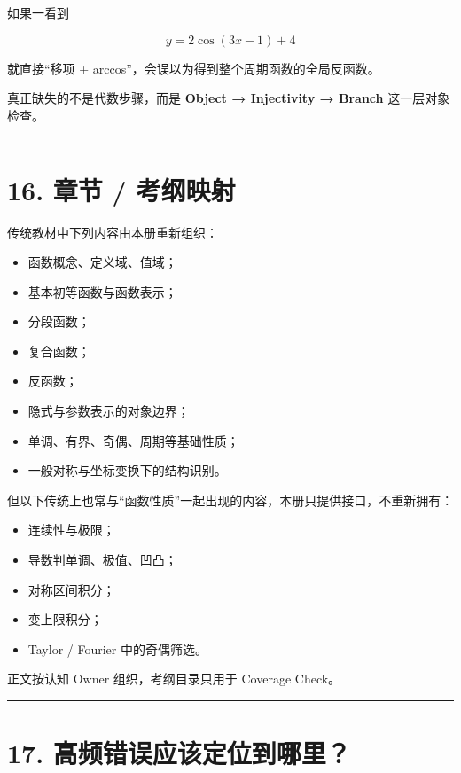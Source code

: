 \documentclass[11pt,a4paper]{ctexart}
\providecommand{\tightlist}{}
\begin{document}
如果一看到

\[
y=2\cos(3x-1)+4
\]

就直接``移项 + arccos''，会误以为得到整个周期函数的全局反函数。

真正缺失的不是代数步骤，而是 \textbf{Object → Injectivity → Branch}
这一层对象检查。

\begin{center}\rule{0.5\linewidth}{0.5pt}\end{center}

\section{16. 章节 /
考纲映射}\label{ux7ae0ux8282-ux8003ux7eb2ux6620ux5c04}

传统教材中下列内容由本册重新组织：

\begin{itemize}
\tightlist
\item
  函数概念、定义域、值域；
\item
  基本初等函数与函数表示；
\item
  分段函数；
\item
  复合函数；
\item
  反函数；
\item
  隐式与参数表示的对象边界；
\item
  单调、有界、奇偶、周期等基础性质；
\item
  一般对称与坐标变换下的结构识别。
\end{itemize}

但以下传统上也常与``函数性质''一起出现的内容，本册只提供接口，不重新拥有：

\begin{itemize}
\tightlist
\item
  连续性与极限；
\item
  导数判单调、极值、凹凸；
\item
  对称区间积分；
\item
  变上限积分；
\item
  Taylor / Fourier 中的奇偶筛选。
\end{itemize}

正文按认知 Owner 组织，考纲目录只用于 Coverage Check。

\begin{center}\rule{0.5\linewidth}{0.5pt}\end{center}

\section{17.
高频错误应该定位到哪里？}\label{ux9ad8ux9891ux9519ux8befux5e94ux8be5ux5b9aux4f4dux5230ux54eaux91cc}
\end{document}
